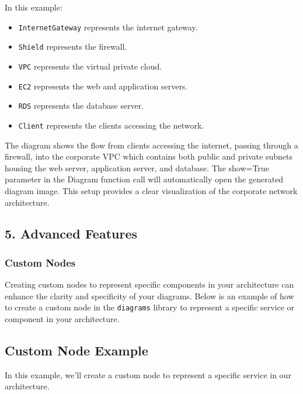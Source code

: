 \documentclass[
  letterpaper,
  DIV=11,
  numbers=noendperiod]{scrreprt}
\providecommand{\tightlist}{%
  \setlength{\itemsep}{0pt}\setlength{\parskip}{0pt}}\usepackage{longtable,booktabs,array}
\begin{document}
In this example:

\begin{itemize}
\tightlist
\item
  \texttt{InternetGateway} represents the internet gateway.
\item
  \texttt{Shield} represents the firewall.
\item
  \texttt{VPC} represents the virtual private cloud.
\item
  \texttt{EC2} represents the web and application servers.
\item
  \texttt{RDS} represents the database server.
\item
  \texttt{Client} represents the clients accessing the network.
\end{itemize}

The diagram shows the flow from clients accessing the internet, passing
through a firewall, into the corporate VPC which contains both public
and private subnets housing the web server, application server, and
database. The show=True parameter in the Diagram function call will
automatically open the generated diagram image. This setup provides a
clear visualization of the corporate network architecture.

\subsection{5. Advanced Features}\label{advanced-features-2}

\subsubsection{Custom Nodes}\label{custom-nodes}

Creating custom nodes to represent specific components in your
architecture can enhance the clarity and specificity of your diagrams.
Below is an example of how to create a custom node in the
\texttt{diagrams} library to represent a specific service or component
in your architecture.

\subsection{Custom Node Example}\label{custom-node-example}

In this example, we'll create a custom node to represent a specific
service in our architecture.
\end{document}
